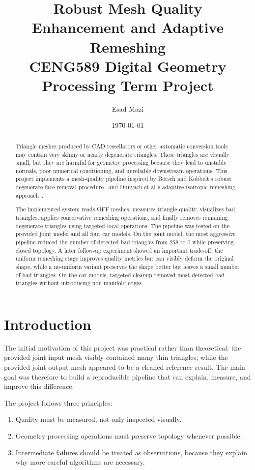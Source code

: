 \documentclass[11pt,a4paper]{article}
\title{\textbf{Robust Mesh Quality Enhancement and Adaptive Remeshing}\\
\large CENG589 Digital Geometry Processing Term Project}
\author{Esad Mazi}
\date{\today}
\begin{document}
\maketitle

\begin{abstract}
Triangle meshes produced by CAD tessellators or other automatic conversion tools may contain very skinny or nearly degenerate triangles. These triangles are visually small, but they are harmful for geometry processing because they lead to unstable normals, poor numerical conditioning, and unreliable downstream operations. This project implements a mesh-quality pipeline inspired by Botsch and Kobbelt's robust degenerate-face removal procedure~\cite{botsch2001degenerate} and Dunyach et al.'s adaptive isotropic remeshing approach~\cite{dunyach2013adaptive}.

The implemented system reads OFF meshes, measures triangle quality, visualizes bad triangles, applies conservative remeshing operations, and finally removes remaining degenerate triangles using targeted local operations. The pipeline was tested on the provided joint model and all four car models. On the joint model, the most aggressive pipeline reduced the number of detected bad triangles from 258 to 0 while preserving closed topology. A later follow-up experiment showed an important trade-off: the uniform remeshing stage improves quality metrics but can visibly deform the original shape, while a no-uniform variant preserves the shape better but leaves a small number of bad triangles. On the car models, targeted cleanup removed most detected bad triangles without introducing non-manifold edges.
\end{abstract}

\section{Introduction}

The initial motivation of this project was practical rather than theoretical: the provided joint input mesh visibly contained many thin triangles, while the provided joint output mesh appeared to be a cleaned reference result. The main goal was therefore to build a reproducible pipeline that can explain, measure, and improve this difference.

The project follows three principles:
\begin{enumerate}
  \item Quality must be measured, not only inspected visually.
  \item Geometry processing operations must preserve topology whenever possible.
  \item Intermediate failures should be treated as observations, because they explain why more careful algorithms are necessary.
\end{enumerate}
\end{document}
